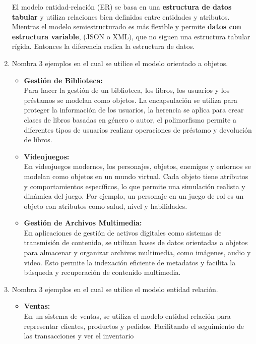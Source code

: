 \documentclass[a4paper,12pt]{article}
\begin{document}
\begin{enumerate}
    \textcolor{water}{El modelo entidad-relación (ER) se basa en una \textbf{estructura de datos tabular} y utiliza relaciones bien definidas entre entidades y atributos. Mientras el modelo semiestructurado es más flexible y permite \textbf{datos con estructura variable},  (JSON o XML), que no siguen una estructura tabular rígida. Entonces la diferencia radica la estructura de datos.}

    \item \textcolor{sun}{Nombra 3 ejemplos en el cual se utilice el modelo orientado a objetos.}
    \begin{itemize}
      \item \textcolor{water}{\textbf{Gestión de Biblioteca:}}\\
      Para hacer la gestión de un biblioteca, los libros, los usuarios y los préstamos se modelan como objetos.
       La encapsulación se utiliza para proteger la información de los usuarios, la herencia se aplica para crear clases de libros 
       basadas en género o autor, el polimorfismo permite a diferentes tipos de usuarios realizar operaciones de préstamo y 
       devolución de libros.

      \item \textcolor{water}{\textbf{Videojuegos:}}\\
       En videojuegos modernos, los personajes, objetos, enemigos y entornos se modelan como objetos en un mundo virtual.
        Cada objeto tiene atributos y comportamientos específicos, lo que permite una simulación realista y dinámica del juego.
         Por ejemplo, un personaje en un juego de rol es un objeto con atributos como salud, nivel y habilidades.

      \item \textcolor{water}{\textbf{Gestión de Archivos Multimedia:}}\\
       En aplicaciones de gestión de activos digitales como sistemas de transmisión de contenido,
        se utilizan bases de datos orientadas a objetos para almacenar y organizar archivos multimedia,
        como imágenes, audio y video. Esto permite la indexación eficiente de metadatos y facilita la búsqueda y recuperación 
        de contenido multimedia.
    \end{itemize}
    \thispagestyle{fancy} %
    \item \textcolor{sun}{Nombra 3 ejemplos en el cual se utilice el modelo entidad relación.}    
    \begin{itemize}
      \item \textcolor{water}{\textbf{Ventas:}}\\
      En un sistema de ventas, se utiliza el modelo entidad-relación para representar clientes,
       productos y pedidos. Facilitando el seguimiento de las transacciones y ver el inventario


\end{itemize}
\end{enumerate}
\end{document}
